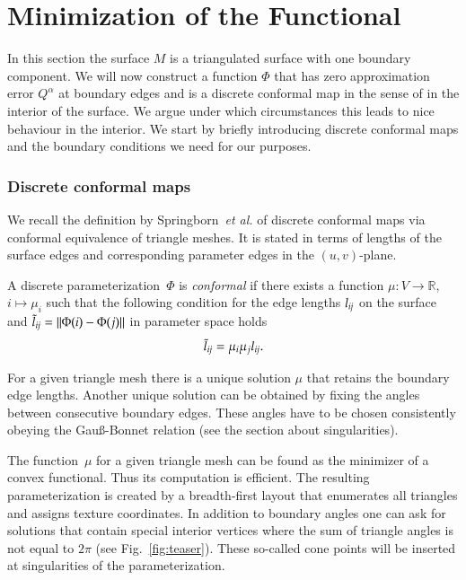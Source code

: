 \documentclass[Thesis.tex]{subfiles}
\begin{document}
\section{Minimization of the Functional}
\label{sec:algorithm}

In this section the surface $M$ is a triangulated surface with one boundary
component. We will now construct a function $\Phi$ that
has zero approximation error $Q^\alpha$ at boundary edges and is a discrete
conformal map in the sense of \cite{Springborn2008} in the interior of the
surface. We argue under which circumstances this leads to nice
behaviour in the interior. We start by briefly introducing discrete conformal
maps and the boundary conditions we need for our purposes.

\subsubsection{Discrete conformal maps}
\label{subsub:discrete_conformal_maps}

We recall the definition by Springborn~\emph{et al.} of discrete conformal 
maps via conformal equivalence of triangle meshes. It is stated in terms of
lengths of the surface edges and corresponding parameter edges in the 
$(u,v)$-plane.
\begin{definition} 
  A discrete parameterization~$\Phi$ is \emph{conformal} if there exists a
function $\mu:V \to \mathbb{R}$, $i \mapsto \mu_i$ such that the following
condition for the edge lengths $l_{\mathrm{\it{ij}}}$ on the surface and
$\tilde{l}_{\mathrm{\it{ij}}}=\Vert\Phi(i)-\Phi(j)\Vert$ in parameter space holds
\begin{eqnarray}
  \label{eq:discrete_conformal} 
  \tilde{l}_{\mathrm{\it{ij}}}=\mu_i\mu_j l_{\mathrm{\it{ij}}}.
\end{eqnarray}
\end{definition}
For a given triangle mesh there is a unique solution $\mu$ that retains the 
boundary edge lengths. Another unique solution can be obtained by fixing 
the angles between consecutive boundary edges. These angles have to be 
chosen consistently obeying the Gau\ss-Bonnet relation 
(see the section about singularities).

The function~$\mu$ for a given triangle mesh can be found as the minimizer 
of a convex functional. Thus its computation is efficient. The resulting 
parameterization is created by a breadth-first layout that enumerates 
all triangles and assigns texture coordinates. In addition to boundary angles 
one can ask for solutions that contain special interior vertices where the
 sum of triangle angles is not equal to $2\pi$ (see Fig.~\ref{fig:teaser}). 
These so-called cone points will be inserted at singularities of the 
parameterization.
\end{document}
